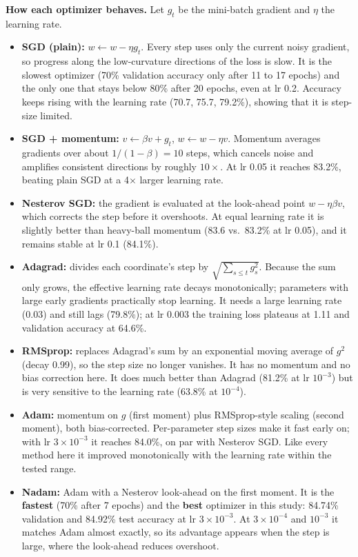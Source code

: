 \documentclass[11pt,a4paper]{article}
\begin{document}
\textbf{How each optimizer behaves.} Let $g_t$ be the mini-batch gradient and $\eta$ the learning rate.
\begin{itemize}
\item \textbf{SGD (plain):} $w \leftarrow w-\eta g_t$. Every step uses only the current noisy gradient, so progress along the low-curvature directions of the loss is slow. It is the slowest optimizer (70\% validation accuracy only after 11 to 17 epochs) and the only one that stays below 80\% after 20 epochs, even at lr 0.2. Accuracy keeps rising with the learning rate (70.7, 75.7, 79.2\%), showing that it is step-size limited.
\item \textbf{SGD + momentum:} $v\leftarrow\beta v+g_t$, $w\leftarrow w-\eta v$. Momentum averages gradients over about $1/(1-\beta)=10$ steps, which cancels noise and amplifies consistent directions by roughly $10\times$. At lr 0.05 it reaches 83.2\%, beating plain SGD at a 4$\times$ larger learning rate.
\item \textbf{Nesterov SGD:} the gradient is evaluated at the look-ahead point $w-\eta\beta v$, which corrects the step before it overshoots. At equal learning rate it is slightly better than heavy-ball momentum (83.6 vs.\ 83.2\% at lr 0.05), and it remains stable at lr 0.1 (84.1\%).
\item \textbf{Adagrad:} divides each coordinate's step by $\sqrt{\sum_{s\le t} g_s^2}$. Because the sum only grows, the effective learning rate decays monotonically; parameters with large early gradients practically stop learning. It needs a large learning rate (0.03) and still lags (79.8\%); at lr 0.003 the training loss plateaus at 1.11 and validation accuracy at 64.6\%.
\item \textbf{RMSprop:} replaces Adagrad's sum by an exponential moving average of $g^2$ (decay 0.99), so the step size no longer vanishes. It has no momentum and no bias correction here. It does much better than Adagrad (81.2\% at lr $10^{-3}$) but is very sensitive to the learning rate (63.8\% at $10^{-4}$).
\item \textbf{Adam:} momentum on $g$ (first moment) plus RMSprop-style scaling (second moment), both bias-corrected. Per-parameter step sizes make it fast early on; with lr $3\times10^{-3}$ it reaches 84.0\%, on par with Nesterov SGD. Like every method here it improved monotonically with the learning rate within the tested range.
\item \textbf{Nadam:} Adam with a Nesterov look-ahead on the first moment. It is the \textbf{fastest} (70\% after 7 epochs) and the \textbf{best} optimizer in this study: 84.74\% validation and 84.92\% test accuracy at lr $3\times10^{-3}$. At $3\times10^{-4}$ and $10^{-3}$ it matches Adam almost exactly, so its advantage appears when the step is large, where the look-ahead reduces overshoot.
\end{itemize}
\end{document}
